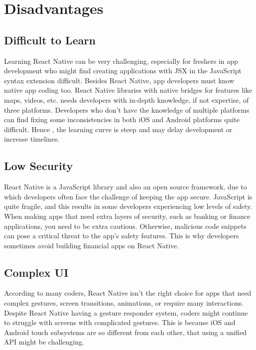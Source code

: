 \documentclass[12pt,a4paper]{report}
\begin{document}
\newpage

\section{Disadvantages}

\subsection{Difficult to Learn}
Learning React Native can be very challenging, especially for freshers in app development who might find creating applications with JSX in the JavaScript syntax extension difficult. Besides React Native, app developers must know native app coding too. React Native libraries with native bridges for features like maps, videos, etc. needs developers with in-depth knowledge, if not expertise, of three platforms. Developers who don’t have the knowledge of multiple platforms can find fixing some inconsistencies in both iOS and Android platforms quite difficult. Hence , the learning curve is steep and may delay development or increase timelines.

\subsection{Low Security}
React Native is a JavaScript library and also an open source framework, due to which developers often face the challenge of keeping the app secure. JavaScript is quite fragile, and this results in some developers experiencing low levels of safety. When making apps that need extra layers of security, such as banking or finance applications, you need to be extra cautious. Otherwise, malicious code snippets can pose a critical threat to the app’s safety features. This is why developers sometimes avoid building financial apps on React Native.

\subsection{Complex UI}
According to many coders, React Native isn’t the right choice for apps that need complex gestures, screen transitions, animations, or require many interactions. Despite React Native having a gesture responder system, coders might continue to struggle with screens with complicated gestures. This is because iOS and Android touch subsystems are so different from each other, that using a unified API might be challenging.
\end{document}
